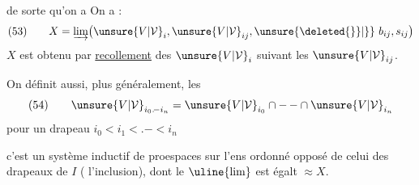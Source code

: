 de sorte qu'on a
On a :
\[
(53)\qquad X=\varinjlim\bigl({\unsure{V|\mathcal V}}_i,{\unsure{V|\mathcal V}}_{ij},
\unsure{\deleted{\}}|\}}\ b_{ij},s_{ij}\bigr)
\]
$X$ est obtenu par \uline{recollement} des ${\unsure{V|\mathcal V}}_i$
suivant les ${\unsure{V|\mathcal V}}_{ij}$.

On définit aussi, plus généralement, les
\[
(54)\qquad {\unsure{V|\mathcal V}}_{i_0.\!-i_n}={\unsure{V|\mathcal V}}_{i_0}\cap
\mathord{-}\,\mathord{-}\cap {\unsure{V|\mathcal V}}_{i_n}
\]
pour un drapeau $i_0<i_1<.\!-<i_n$

c'est un système inductif de  proespaces
sur l'ens ordonné opposé de celui des drapeaux de $I$
( l'inclusion), dont le $\uline{\lim}$ est égalt $\approx X$.

